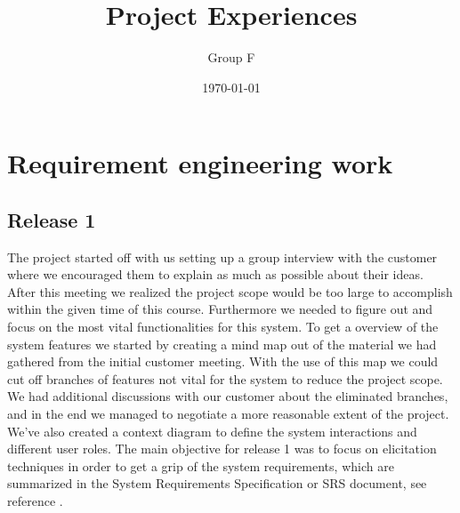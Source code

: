 \documentclass[10pt]{article}
\begin{document}
\makeatletter
\renewcommand{\@biblabel}[1]{\quad#1.}
\makeatother


\pagestyle{myheadings}





\begin{titlepage}
\title{Project Experiences}
\author{Group F}
\date{\today}
\maketitle
\thispagestyle{empty}
\end{titlepage}

\tableofcontents
\thispagestyle{empty}
\newpage
{}

\section{Requirement engineering work}

\subsection{Release 1}
The project started off with us setting up a group interview with the customer where we encouraged them to explain as much as possible about their ideas. After this meeting we realized the project scope would be too large to accomplish within the given time of this course. Furthermore we needed to figure out and focus on the most vital functionalities for this system.
To get a overview of the system features we started by creating a mind map out of the material we had gathered from the initial customer meeting. With the use of this map we could cut off branches of features not vital for the system to reduce the project scope.
We had additional discussions with our customer about the eliminated branches, and in the end we managed to negotiate a more reasonable extent of the project.
\newline We've also created a context diagram to define the system interactions and different user roles.
The main objective for release 1 was to focus on elicitation techniques in order to get a grip of the system requirements, which are summarized in the System Requirements Specification or SRS document, see reference \cite{srs}.
\end{document}

